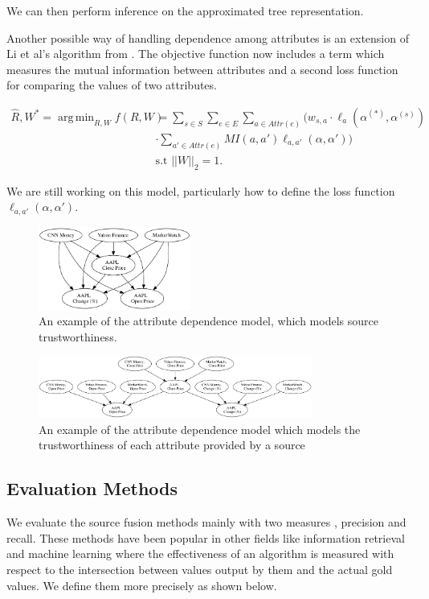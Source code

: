 \documentclass{acm_proc_article-sp}
\DeclareMathOperator*{\argmin}{arg\,min}
\begin{document}
We can then perform inference on the approximated tree representation.

Another possible way of handling dependence among attributes is an extension of Li et al's algorithm from \cite{li:resolving}. The objective function now includes a term which measures the mutual information between attributes and a second loss function for comparing the values of two attributes.  

\begin{align}
\hat{R}, W^* = \argmin_{R,W} f(R, W) & = \sum_{s \in S} \sum_{e \in E} \sum_{a \in Attr(e)} \Bigg ( w_{s,a} \cdot \ell_a(\alpha^{(*)}, \alpha^{(s)}) \nonumber \\
&  \cdot \sum_{a' \in Attr(e)} MI(a,a') \ell_{a,a'}(\alpha,\alpha')  \Bigg ) \\
& \text{s.t } ||W||_2 =1. \nonumber 
\end{align}

We are still working on this model, particularly how to define the loss function $\ell_{a,a'}(\alpha,\alpha')$. 



\begin{figure}
\centering
\includegraphics[width=5cm]{bn1.png}
\caption{An example of the attribute dependence model, which models source trustworthiness.}
\end{figure}

\begin{figure}
\centering
\includegraphics[width=9cm]{bn2.png}
\caption{An example of the attribute dependence model which models the trustworthiness of each attribute provided by a source}
\end{figure}

\subsection{Evaluation Methods}
We evaluate the source fusion methods mainly with two measures , precision and recall. These methods have been popular in other fields like information retrieval and machine learning where the effectiveness of an algorithm is measured with respect to the intersection between values output by them and the actual gold values. 
We define them more precisely as shown below.
\end{document}
